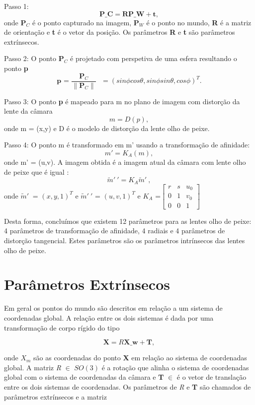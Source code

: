 Passo 1:  \[ \textbf{P_C} = \textbf{RP_W} + \textbf{t} , \] onde $\textbf{P}_C$ é o ponto capturado na imagem, $\textbf{P}_W$ é o ponto no mundo, \textbf{R} é a matriz de orientação e \textbf{t} é o vetor da posição. Os parâmetros \textbf{R} e \textbf{t} são parâmetros extrínsecos. 

Passo 2: O ponto $\textbf{P}_C$ é projetado com perspetiva de uma esfera resultando o ponto \textbf{p} \[ \textbf{p = $\frac{\textbf{P}_C}{ \| \textbf{P}_C \| }$ } = ( sin \phi cos \theta, sin \phi sin \theta, cos \phi)^T  . \]

Passo 3: O ponto \textbf{p} é mapeado para m no plano de imagem com distorção da lente da câmara \[ m = D(p) , \] onde m = (x,y) e D é o modelo de distorção da lente olho de peixe. 

Passo 4: O ponto m é transformado em m' usando a transformação de afinidade: \[ m' = K_A(m) , \] onde m' = (u,v). A imagem obtida é a imagem atual da câmara com lente olho de peixe que é igual : \[ \widetilde{m}'\ ' = K_A \widetilde{m}'\  ,\] onde $\widetilde{m}'\ $ = $(x,y,1)^T$ e $\widetilde{m}'\ '$ = $(u,v,1)^T$ e $K_A$ =$\left[ \begin{array}{ccc}
	r & s & u_0 \\ 
	0 & 1 & v_0 \\ 
	0 & 0 & 1
\end{array} \right]$ 


Desta forma, concluímos que existem 12 parâmetros para as lentes olho de peixe: 4 parâmetros de transformação de afinidade, 4 radiais e 4 parâmetros de distorção tangencial. Estes parâmetros são os parâmetros intrínsecos das lentes olho de peixe.




\section{Parâmetros Extrínsecos}

Em geral os pontos do mundo são descritos em relação a um sistema de coordenadas global. A relação entre os dois sistemas é dada por uma transformação de corpo rígido do tipo

\[ \textbf{X} = R\textbf{X_w} + \textbf{T},  \]

onde \textbf{$X_m$} são as coordenadas do ponto \textbf{X} em relação ao sistema de coordenadas global. A matriz \textit{R} $\in$ \textit{$SO(3)$} é a rotação que alinha o sistema de coordenadas global com o sistema de coordenadas da câmara e \textbf{T} $\in$  é o vetor de translação entre os dois sistemas de coordenadas. Os parâmetros de \textit{R} e \textbf{T} são chamados de parâmetros extrínsecos e a matriz 

